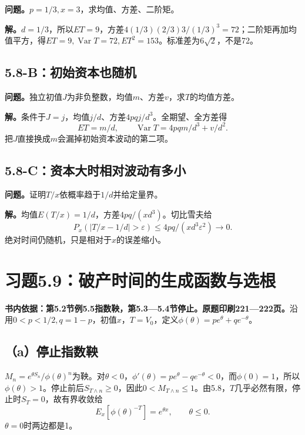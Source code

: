\documentclass[11pt,a4paper,UTF8,fontset=fandol]{ctexart}
\begin{document}
\textbf{问题。}\(p=1/3,x=3\)，求均值、方差、二阶矩。

\textbf{解。}\(d=1/3\)，所以\(ET=9\)，方差\(4(1/3)(2/3)3/(1/3)^3=72\)；二阶矩再加均值平方，得\(\boxed{ET=9,\operatorname{Var}T=72,ET^2=153}\)。标准差为\(6\sqrt2\)，不是72。

\subsection{5.8-B：初始资本也随机}\label{bux521dux59cbux8d44ux672cux4e5fux968fux673a}

\textbf{问题。}独立初值\(J\)为非负整数，均值\(m\)、方差\(v\)，求\(T\)的均值方差。

\textbf{解。}条件于\(J=j\)，均值\(j/d\)、方差\(4pqj/d^3\)。全期望、全方差得
\[\boxed{ET=m/d,\qquad\operatorname{Var}T=4pqm/d^3+v/d^2.}\]
把\(J\)直接换成\(m\)会漏掉初始资本波动的第二项。

\subsection{5.8-C：资本大时相对波动有多小}\label{cux8d44ux672cux5927ux65f6ux76f8ux5bf9ux6ce2ux52a8ux6709ux591aux5c0f}

\textbf{问题。}证明\(T/x\)依概率趋于\(1/d\)并给定量界。

\textbf{解。}均值\(E(T/x)=1/d\)，方差\(4pq/(xd^3)\)。切比雪夫给
\[\boxed{P_x(|T/x-1/d|>\varepsilon)\le4pq/(xd^3\varepsilon^2)\to0.}\]
绝对时间仍随机，只是相对于\(x\)的误差缩小。

\bigskip

\section{习题5.9：破产时间的生成函数与选根}\label{ux4e60ux98985.9ux7834ux4ea7ux65f6ux95f4ux7684ux751fux6210ux51fdux6570ux4e0eux9009ux6839}

\textbf{书内依据：第5.2节例5.5指数鞅，第5.3---5.4节停止。原题印刷221---222页。}沿用\(0<p<1/2,q=1-p\)，初值\(x\)，\(T=V_0\)，定义\(\phi(\theta)=pe^\theta+qe^{-\theta}\)。

\subsection{（a）停止指数鞅}\label{aux505cux6b62ux6307ux6570ux9785}

\(M_n=e^{\theta S_n}/\phi(\theta)^n\)为鞅。对\(\theta<0\)，\(\phi'(\theta)=pe^\theta-qe^{-\theta}<0\)，而\(\phi(0)=1\)，所以\(\phi(\theta)>1\)。停止前后\(S_{T\wedge n}\ge0\)，因此\(0<M_{T\wedge n}\le1\)。由5.8，\(T\)几乎必然有限，停止时\(S_T=0\)，故有界收敛给
\[\boxed{E_x[\phi(\theta)^{-T}]=e^{\theta x},\qquad\theta\le0.}\]
\(\theta=0\)时两边都是1。
\end{document}
